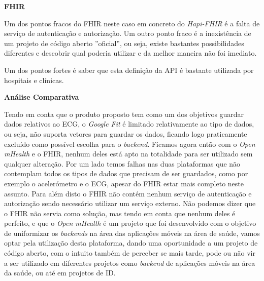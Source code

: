 \textbf{FHIR}
\par
Um dos pontos fracos do FHIR neste caso em concreto do \textit{Hapi-FHIR} é a falta de serviço de autenticação e autorização. Um outro ponto fraco é a inexistência de um projeto de código aberto ''oficial'', ou seja, existe bastantes possibilidades diferentes e descobrir qual poderia utilizar e da melhor maneira não foi imediato.
\par
Um dos pontos fortes é saber que esta definição da \gls{API} é bastante utilizada por hospitais e clínicas.
\par
\textbf{Análise Comparativa}
\par
Tendo em conta que o produto proposto tem como um dos objetivos guardar dados relativos ao \gls{ECG}, o \textit{Google Fit} é limitado relativamente ao tipo de dados, ou seja, não suporta vetores para guardar os dados, ficando logo praticamente excluído como possível escolha para o \textit{backend}.
Ficamos agora então com o \textit{Open mHealth} e o \gls{FHIR}, nenhum deles está apto na totalidade para ser utilizado sem qualquer alteração. Por um lado temos falhas nas duas plataformas que não contemplam todos os tipos de dados que precisam de ser guardados, como por exemplo o acelerómetro e o \gls{ECG}, apesar do \gls{FHIR} estar mais completo neste assunto.
Para além disto o \gls{FHIR} não contém nenhum serviço de autenticação e autorização sendo necessário utilizar um serviço externo.
Não podemos dizer que o \gls{FHIR} não servia como solução, mas tendo em conta que nenhum deles é perfeito, e que o \textit{Open mHealth} é um projeto que foi desenvolvido com o objetivo de uniformizar os \textit{backends} na área das aplicações móveis na área de saúde, vamos optar pela utilização desta plataforma, dando uma oportunidade a um projeto de código aberto, com o intuito também de perceber se mais tarde, pode ou não vir a ser utilizado em diferentes projetos como \textit{backend} de aplicações móveis na área da saúde, ou até em projetos de \gls{ID}.

\cleardoublepage